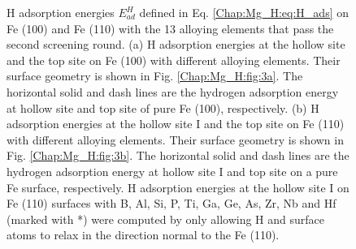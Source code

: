 \begingroup
\begin{figure}[!ht]
  \centering
  \label{Chap:Mg_H:fig:8a}
  \label{Chap:Mg_H:fig:8b}
\caption[H adsorption energies on Fe (100) and Fe (110) with the 13 alloying elements that pass the second screening round]{H adsorption energies $E_{ad}^H$ defined in Eq. \ref{Chap:Mg_H:eq:H_ads} on Fe (100) and Fe (110) with the 13 alloying elements that pass the second screening round.  (a) H adsorption energies at the hollow site and the top site on Fe (100) with different alloying elements. Their surface geometry is shown in Fig. \ref{Chap:Mg_H:fig:3a}. The horizontal solid and dash lines are the hydrogen adsorption energy at hollow site and top site of pure Fe (100), respectively. (b) H adsorption energies at the hollow site I and the top site on Fe (110) with different alloying elements. Their surface geometry is shown in Fig. \ref{Chap:Mg_H:fig:3b}. The horizontal solid and dash lines are the hydrogen adsorption energy at hollow site I and top site on a pure Fe surface, respectively. H adsorption energies at the hollow site I on Fe (110) surfaces with B, Al, Si, P, Ti, Ga, Ge, As, Zr, Nb and Hf (marked with *) were computed by only allowing H and surface atoms to relax in the direction normal to the Fe (110).}
  \label{Chap:Mg_H:fig8}
\end{figure}
\endgroup
